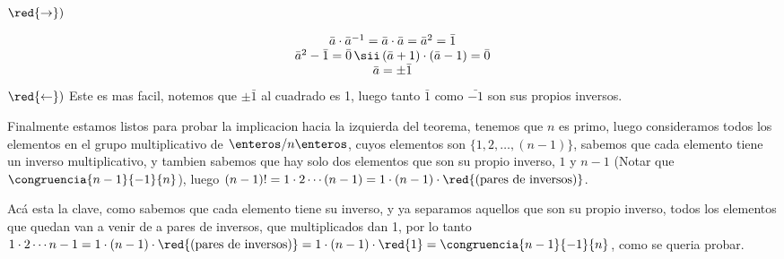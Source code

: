 $\red{\rightarrow})$ 

$$
 \begin{array}{c}
 \bar{a} \cdot \bar{a}^{-1} = \bar{a} \cdot \bar{a} = \bar{a}^2 = \bar{1} \\
 \bar{a}^2 - \bar{1} = \bar{0} \, \sii \, (\bar{a} + 1)\cdot(\bar{a} - 1) = \bar{0} \\
 \bar{a} = \pm \bar{1}
 \end{array}
$$ 
$\red{\leftarrow})$ Este es mas facil, notemos que $\pm \bar{1}$ al cuadrado es 1, luego tanto $\bar{1}$ como $\bar{-1}$ son sus propios inversos. 

Finalmente estamos listos para probar la implicacion hacia la izquierda del teorema, tenemos que $n$ es primo, luego consideramos todos los 
elementos en el grupo multiplicativo de $\enteros/n\enteros$, cuyos elementos son $\{1,2, \ldots , (n - 1)\}$, sabemos que cada elemento tiene un inverso 
multiplicativo, y tambien sabemos que hay solo dos elementos que son su propio inverso, $1$ y $n-1$ (Notar que $\congruencia{n-1}{-1}{n}$), luego $(n-1)! = 1\cdot 2\cdots (n - 1) = 1 \cdot (n - 1) \cdot \red{\text{(pares de inversos)}}$. 

Acá esta la clave, como sabemos que cada elemento tiene su inverso, y ya separamos aquellos que son su propio inverso, todos los elementos que quedan van a venir de a pares de inversos, que multiplicados dan 1,
por lo tanto $1\cdot 2\cdots n-1 = 1 \cdot (n - 1) \cdot \red{\text{(pares de inversos)}} = 1 \cdot (n - 1) \cdot \red{1} = \congruencia{n-1}{-1}{n}$, como se queria probar.

\begin{aportes}
  \item {}
\end{aportes}
